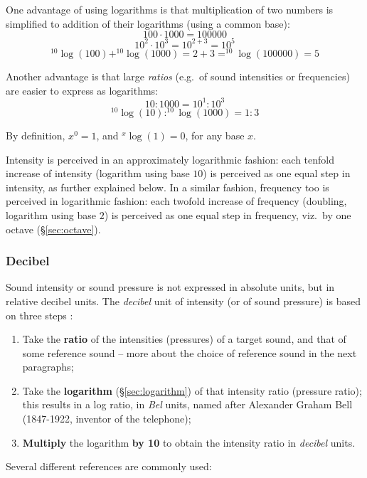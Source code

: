 \documentclass[
]{book}
\begin{document}
One advantage of using logarithms is that multiplication of two numbers is simplified to addition of their logarithms (using a common base):
\[100 \cdot 1000 = 100000\]
\[10^2 \cdot 10^3 = 10^{2+3} = 10^5\]
\[^{10}\log(100) + ^{10}\log(1000) =2+3= ^{10}\log(100000) =5\]

Another advantage is that large \emph{ratios} (e.g.~of sound intensities or frequencies) are easier to express as logarithms:
\[10 : 1000 = 10^1 : 10^3\]
\[^{10}\log(10) : ^{10}\log(1000) = 1 : 3\]

\protect{}\label{log1}
By definition, \(x^0=1\), and \(^x\log(1)=0\), for any base \(x\).

Intensity is perceived in an approximately logarithmic fashion: each tenfold increase of intensity (logarithm using base \(10\)) is perceived as one equal step in intensity, as further explained below. In a similar fashion, frequency too is perceived in logarithmic fashion: each twofold increase of frequency (doubling, logarithm using base \(2\)) is perceived as one equal step in frequency, viz.~by one octave (§\ref{sec:octave}).

\subsubsection{Decibel}\label{sec:decibel}

Sound intensity or sound pressure is not expressed in absolute units, but in relative decibel units. The \emph{decibel} unit of intensity (or of sound pressure) is based on three steps \citep[p.91ff]{Fry_1979}:

\begin{enumerate}
\def\labelenumi{\arabic{enumi}.}
\item
  Take the \textbf{ratio} of the intensities (pressures) of a target sound, and that of some reference sound -- more about the choice of reference sound in the next paragraphs;
\item
  Take the \textbf{logarithm} (§\ref{sec:logarithm}) of that intensity ratio (pressure ratio); this results in a log ratio, in \emph{Bel} units, named after Alexander Graham Bell (1847-1922, inventor of the telephone);
\item
  \textbf{Multiply} the logarithm \textbf{by 10} to obtain the intensity ratio in \emph{decibel} units.
\end{enumerate}

Several different references are commonly used:
\end{document}
